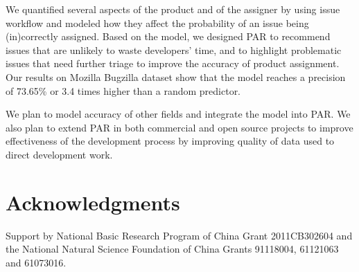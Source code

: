 \documentclass{sig-alternate}
\begin{document}
We quantified several aspects of the product and of the assigner
by using issue workflow and modeled how they affect
the probability of an issue being (in)correctly assigned.  Based on
the model, we designed PAR to recommend
issues that are unlikely to waste developers' time,
and to highlight problematic issues that need further
triage to improve the accuracy of product assignment.
Our results on Mozilla Bugzilla dataset show
that the model reaches a precision of 73.65\% or 3.4 times
higher than a random predictor.

We plan to model accuracy of other fields and integrate the model
into PAR.  We also plan to extend PAR in both commercial and open
source projects to improve effectiveness of the development process
by improving quality of data used to direct development work.

\balance
\section{Acknowledgments}
Support by National Basic Research Program of China Grant
2011CB302604 and the National Natural Science Foundation of China
Grants 91118004, 61121063 and 61073016.
\end{document}
